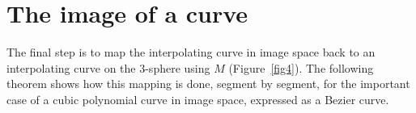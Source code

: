 
\section{The image of a curve}
\label{sec:curveimage}

The final step is to map the interpolating curve in image space 
back to an interpolating curve on the 3-sphere using $M$ (Figure~\ref{fig4}).
The following theorem shows how this mapping is done, segment by segment,
for the important case of a cubic polynomial curve in image space,
expressed as a Bezier curve.

